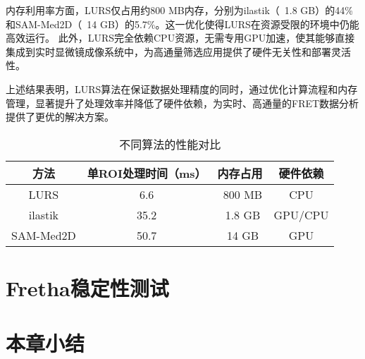 内存利用率方面，LURS仅占用约800 MB内存，分别为ilastik（~1.8 GB）的44\%和SAM-Med2D（~14 GB）的5.7\%。这一优化使得LURS在资源受限的环境中仍能高效运行。
此外，LURS完全依赖CPU资源，无需专用GPU加速，使其能够直接集成到实时显微镜成像系统中，为高通量筛选应用提供了硬件无关性和部署灵活性。  

上述结果表明，LURS算法在保证数据处理精度的同时，通过优化计算流程和内存管理，显著提升了处理效率并降低了硬件依赖，为实时、高通量的FRET数据分析提供了更优的解决方案。

\begin{table*}[htbp]
    \centering
    \caption{不同算法的性能对比}
    \begin{tabular}{cccc}
    \toprule
    方法 & 单ROI处理时间（ms） & 内存占用 & 硬件依赖 \\
    \midrule
    LURS & 6.6 & ~800 MB & CPU \\
    ilastik & 35.2 & ~1.8 GB & GPU/CPU \\
    SAM-Med2D & 50.7 & ~14 GB & GPU \\
    \bottomrule
    \end{tabular}
    \label{tab5}
\end{table*}

\section{Fretha稳定性测试}

\section{本章小结}